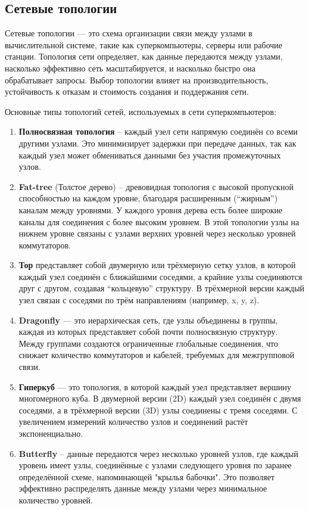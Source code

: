 \documentclass[11pt,a4paper,final]{article} %
\begin{document}
\subsection{Сетевые топологии}

\par Сетевые топологии — это схема организации связи между узлами в вычислительной системе, такие как суперкомпьютеры, серверы или рабочие станции. Топология сети определяет, как данные передаются между узлами, насколько эффективно сеть масштабируется, и насколько быстро она обрабатывает запросы. Выбор топологии влияет на производительность, устойчивость к отказам и стоимость создания и поддержания сети.

\par Основные типы топологий сетей, используемых в сети суперкомпьютеров:

\begin{enumerate}
	\item \textbf{Полносвязная топология} -- каждый узел сети напрямую соединён со всеми другими узлами. Это минимизирует задержки при передаче данных, так как каждый узел может обмениваться данными без участия промежуточных узлов.
	
	\item \textbf{Fat-tree} (Толстое дерево) -- древовидная топология с высокой пропускной способностью на каждом уровне, благодаря расширенным (``жирным'') каналам между уровнями. У каждого уровня дерева есть более широкие каналы для соединения с более высоким уровнем. В этой топологии узлы на нижнем уровне связаны с узлами верхних уровней через несколько уровней коммутаторов.
	
	
	\item \textbf{Тор} представляет собой двумерную или трёхмерную сетку узлов, в которой каждый узел соединён с ближайшими соседями, а крайние узлы соединяются друг с другом, создавая ``кольцевую'' структуру. В трёхмерной версии каждый узел связан с соседями по трём направлениям (например, x, y, z).
	
	\item \textbf{Dragonfly} — это иерархическая сеть, где узлы объединены в группы, каждая из которых представляет собой почти полносвязную структуру. Между группами создаются ограниченные глобальные соединения, что снижает количество коммутаторов и кабелей, требуемых для межгрупповой связи.
	
	\item \textbf{Гиперкуб} — это топология, в которой каждый узел представляет вершину многомерного куба. В двумерной версии (2D) каждый узел соединён с двумя соседями, а в трёхмерной версии (3D) узлы соединены с тремя соседями. С увеличением измерений количество узлов и соединений растёт экспоненциально.
	
	\item \textbf{Butterfly} -- данные передаются через несколько уровней узлов, где каждый уровень имеет узлы, соединённые с узлами следующего уровня по заранее определённой схеме, напоминающей "крылья бабочки". Это позволяет эффективно распределять данные между узлами через минимальное количество уровней.
	
\end{enumerate}
\end{document}
